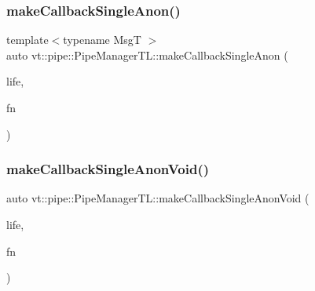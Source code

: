 \subsubsection{\texorpdfstring{make\+Callback\+Single\+Anon()}{makeCallbackSingleAnon()}\hspace{0.1cm}{\footnotesize\ttfamily [6/6]}}
{\footnotesize\ttfamily template$<$typename MsgT $>$ \\
auto vt\+::pipe\+::\+Pipe\+Manager\+T\+L\+::make\+Callback\+Single\+Anon (\begin{DoxyParamCaption}\item[{\hyperlink{namespacevt_1_1pipe_acb42b284378c0fdac1d7c6335dc26f58}{Lifetime\+Enum}}]{life,  }\item[{\hyperlink{structvt_1_1pipe_1_1_pipe_manager_base_aa54eee64ab32a27777a672d49eb861f4}{Func\+Msg\+Type}$<$ MsgT $>$}]{fn }\end{DoxyParamCaption})}

\mbox{\label{structvt_1_1pipe_1_1_pipe_manager_t_l_ac22b018279b274ddc9a46b3abfc69a64}} 
\subsubsection{\texorpdfstring{make\+Callback\+Single\+Anon\+Void()}{makeCallbackSingleAnonVoid()}}
{\footnotesize\ttfamily auto vt\+::pipe\+::\+Pipe\+Manager\+T\+L\+::make\+Callback\+Single\+Anon\+Void (\begin{DoxyParamCaption}\item[{\hyperlink{namespacevt_1_1pipe_acb42b284378c0fdac1d7c6335dc26f58}{Lifetime\+Enum}}]{life,  }\item[{\hyperlink{structvt_1_1pipe_1_1_pipe_manager_base_acd6f0c71f38f08d53f85e83b65406d77}{Func\+Void\+Type}}]{fn }\end{DoxyParamCaption})\hspace{0.3cm}{\ttfamily [inline]}}

\mbox{\label{structvt_1_1pipe_1_1_pipe_manager_t_l_a9644742f82b43a851e8a20755302a2e0}} 
